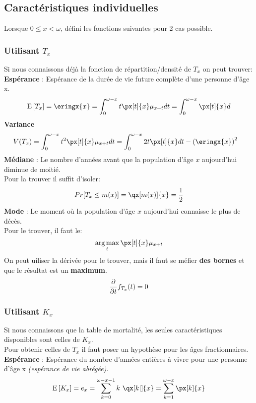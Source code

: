 \documentclass[10pt, french]{article}
\DeclareMathOperator*{\argmax}{arg\,max}
\begin{document}
\begin{multicols*}{3}
\subsection{Caractéristiques individuelles}

Lorsque $0 \leq x < \omega $, défini les fonctions suivantes pour 2 cas possible.

\subsubsection*{Utilisant $T_x$}
Si nous connaissons déjà la fonction de répartition/densité de $T_x$ on peut trouver:\\

\textbf{Espérance} : Espérance de la durée de vie future complète d'une personne d'âge x.
	\[	
		\esp{T_x} = 
		\eringx{x} =  
		\int_{0}^{\omega - x} t \px[t]{x} \mu_{x+t} dt = 
		\int_{0}^{\omega - x} \px[t]{x} d
	\]
\textbf{Variance}
	\begin{align*}
		V(T_x) &= 
		\int_{0}^{\omega - x} t^2 \px[t]{x} \mu_{x+t} dt = 
		\int_{0}^{\omega - x} 2 t  \px[t]{x} dt - \left(\eringx{x}\right)^2 
	\end{align*}
\textbf{Médiane} : Le nombre d'années avant que la population d'âge $x$ aujourd'hui diminue de moitié. \\
	Pour la trouver il suffit d'isoler:
	\[
		Pr[T_x \leq m(x)] = \qx[m(x)]{x} = \frac{1}{2}
	\]
\textbf{Mode} : Le moment où la population d'âge $x$ aujourd'hui connaisse le plus de décès.\\
	Pour le trouver, il faut le: 
	\[ \argmax_t \px[t]{x} \mu_{x + t} \]
	On peut uiliser la dérivée pour le trouver, mais il faut se méfier \textbf{des bornes} et que le résultat est un \textbf{maximum}.
	\[
		\frac{\partial}{\partial t} f_{T_x}(t) = 0
	\]	

\subsubsection*{Utilisant $K_x$}
Si nous connaissons que la table de mortalité, les seules caractéristiques disponibles sont celles de $K_x$. \\
Pour obtenir celles de $T_x$ il faut poser un hypothèse pour les âges fractionnaires.\\

\textbf{Espérance} : Espérance du nombre d'années entières à vivre pour une personne d'âge x \textit{(espérance de vie abrégée)}.
	\[	
		\esp{K_x} = 
		e_{x} =  
		\sum_{k = 0}^{\omega - x - 1} k \ \qx[k | ]{x} =  
		\sum_{k = 1}^{\omega - x} \px[k]{x} 
	\]


\end{multicols*}
\end{document}
